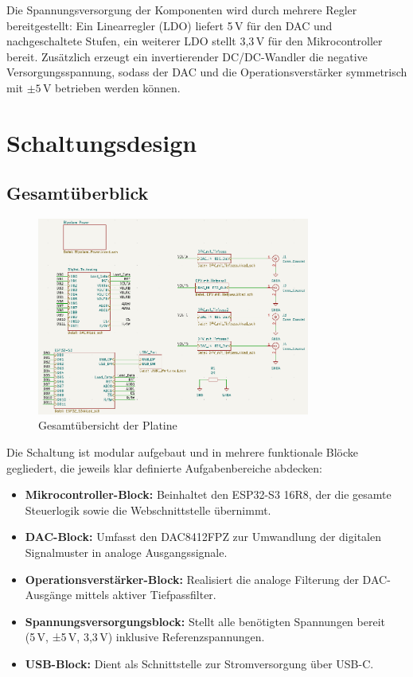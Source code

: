 Die Spannungsversorgung der Komponenten wird durch mehrere Regler bereitgestellt: Ein Linearregler (LDO) liefert 5\,V für den DAC und nachgeschaltete Stufen, ein weiterer LDO stellt 3{,}3\,V für den Mikrocontroller bereit. Zusätzlich erzeugt ein invertierender DC/DC-Wandler die negative Versorgungsspannung, sodass der DAC und die Operationsverstärker symmetrisch mit \(\pm5\,\text{V}\) betrieben werden können.


\section{Schaltungsdesign}
\subsection{Gesamtüberblick}
\begin{figure}[H]
    \centering
    \includegraphics[width=0.8\textwidth]{bilder/Platine_gesamt.png}
    \caption{Gesamtübersicht der Platine}
    \label{fig:gesamtuebersicht}
\end{figure}
Die Schaltung ist modular aufgebaut und in mehrere funktionale Blöcke gegliedert, die jeweils klar definierte Aufgabenbereiche abdecken:

\begin{itemize}
    \item \textbf{Mikrocontroller-Block:} Beinhaltet den ESP32-S3 16R8, der die gesamte Steuerlogik sowie die Webschnittstelle übernimmt.
    \item \textbf{DAC-Block:} Umfasst den DAC8412FPZ zur Umwandlung der digitalen Signalmuster in analoge Ausgangssignale.
    \item \textbf{Operationsverstärker-Block:} Realisiert die analoge Filterung der DAC-Ausgänge mittels aktiver Tiefpassfilter.
    \item \textbf{Spannungsversorgungsblock:} Stellt alle benötigten Spannungen bereit (5 V, ±5 V, 3{,}3 V) inklusive Referenzspannungen.
    \item \textbf{USB-Block:} Dient als Schnittstelle zur Stromversorgung über USB-C.
\end{itemize}





